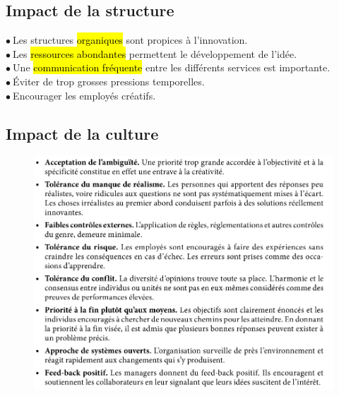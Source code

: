 \documentclass[letterpaper, 12pt]{article}
\newcommand{\point}{$\bullet\ $}
\begin{document}
	\subsection{Impact de la structure}
		\point Les structures \hl{organiques} sont propices à l'innovation.\\
		\point Les \hl{ressources abondantes} permettent le développement de l'idée.\\
		\point Une \hl{communication fr\'equente} entre les différents services est importante.\\
		\point \'Eviter de trop grosses pressions temporelles.\\
		\point Encourager les employés cr\'eatifs.
	\subsection{Impact de la culture}
		\begin{figure}[H]
			\centering
			\includegraphics[scale=0.6]{Images/innovation_culture}
		\end{figure}\noindent
\pagebreak
\end{document}
